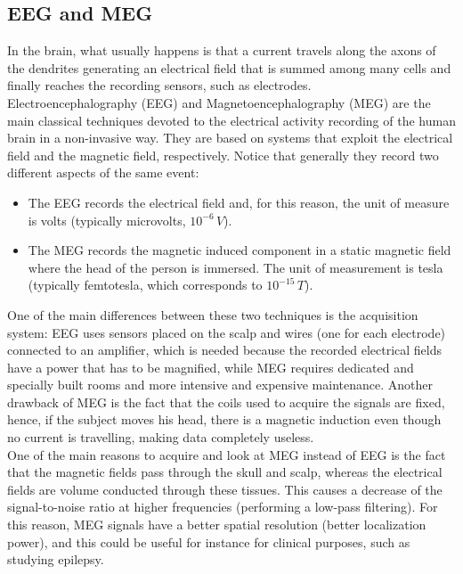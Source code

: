 \subsection{EEG and MEG}
In the brain, what usually happens is that a current travels along the axons of the dendrites
generating an electrical field that is summed among many cells and finally reaches the
recording sensors, such as electrodes.\\
Electroencephalography (EEG) and Magnetoencephalography (MEG) are the main classical
techniques devoted to the electrical activity recording of the human brain in a non-invasive
way. They are based on systems that exploit the electrical field and the magnetic field,
respectively. Notice that generally they record two different aspects of the same event:
\begin{itemize}
    \item The EEG records the electrical field and, for this reason, the unit of measure
          is volts (typically
          microvolts, \(10^{-6}\,V\)).
    \item The MEG records the magnetic induced component in a static magnetic field where
          the head of the person is immersed. The unit of measurement is tesla (typically
          femtotesla, which corresponds to \(10^{-15}\,T\)).
\end{itemize}
One of the main differences between these two techniques is the acquisition system: EEG
uses sensors placed on the scalp and wires (one for each electrode) connected to an amplifier,
which is needed because the recorded electrical fields have a power that has to be magnified,
while MEG requires dedicated and specially built rooms and more intensive and expensive
maintenance. Another drawback of MEG is the fact that the coils used to acquire the signals
are fixed, hence, if the subject moves his head, there is a magnetic induction even though
no current is travelling, making data completely useless.\\
One of the main reasons to acquire and look at MEG instead of EEG is the fact that the
magnetic fields pass through the skull and scalp, whereas the electrical fields are volume
conducted through these tissues. This causes a decrease of the signal-to-noise ratio at
higher frequencies (performing a low-pass filtering). For this reason, MEG signals have a
better spatial resolution (better localization power), and this could be useful for instance
for clinical purposes, such as studying epilepsy.
